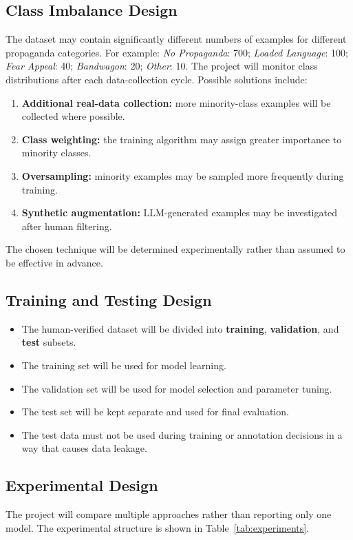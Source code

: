 \documentclass[12pt,a4paper]{report}
\begin{document}
\subsection{Class Imbalance Design}
The dataset may contain significantly different numbers of examples for different
propaganda categories. For example: \emph{No Propaganda}: 700; \emph{Loaded
Language}: 100; \emph{Fear Appeal}: 40; \emph{Bandwagon}: 20; \emph{Other}: 10.
The project will monitor class distributions after each data-collection cycle.
Possible solutions include:
\begin{enumerate}
  \item \textbf{Additional real-data collection:} more minority-class examples will
        be collected where possible.
  \item \textbf{Class weighting:} the training algorithm may assign greater
        importance to minority classes.
  \item \textbf{Oversampling:} minority examples may be sampled more frequently
        during training.
  \item \textbf{Synthetic augmentation:} LLM-generated examples may be investigated
        after human filtering.
\end{enumerate}
The chosen technique will be determined experimentally rather than assumed to be
effective in advance.

\subsection{Training and Testing Design}
\begin{itemize}
  \item The human-verified dataset will be divided into \textbf{training},
        \textbf{validation}, and \textbf{test} subsets.
  \item The training set will be used for model learning.
  \item The validation set will be used for model selection and parameter tuning.
  \item The test set will be kept separate and used for final evaluation.
  \item The test data must not be used during training or annotation decisions in a
        way that causes data leakage.
\end{itemize}

\subsection{Experimental Design}
The project will compare multiple approaches rather than reporting only one model.
The experimental structure is shown in Table~\ref{tab:experiments}.
\end{document}
